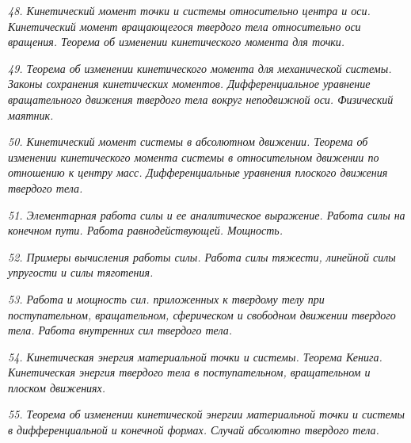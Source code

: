 \newpage %

\emph{48. Кинетический момент точки и системы относительно центра и оси.
Кинетический момент вращающегося твердого тела относительно оси вращения.
Теорема об изменении кинетического момента для точки.}

\newpage %

\emph{49. Теорема об изменении кинетического момента для механической системы.
Законы сохранения кинетических моментов. Дифференциальное уравнение
вращательного движения твердого тела вокруг неподвижной оси. Физический
маятник.}

\newpage %

\emph{50. Кинетический момент системы в абсолютном движении. Теорема об
изменении кинетического момента системы в относительном движении по
отношению к центру масс. Дифференциальные уравнения плоского движения
твердого тела.}

\newpage %

\emph{51. Элементарная работа силы и ее аналитическое выражение. Работа силы на
конечном пути. Работа равнодействующей. Мощность.}

\newpage %

\emph{52. Примеры вычисления работы силы. Работа силы тяжести, линейной силы
упругости и силы тяготения.}

\newpage %

\emph{53. Работа и мощность сил. приложенных к твердому телу при поступательном,
вращательном, сферическом и свободном движении твердого тела. Работа
внутренних сил твердого тела.}

\newpage %

\emph{54. Кинетическая энергия материальной точки и системы. Теорема Кенига.
Кинетическая энергия твердого тела в поступательном, вращательном и плоском
движениях.}

\newpage %

\emph{55. Теорема об изменении кинетической энергии материальной точки и системы
в дифференциальной и конечной формах. Случай абсолютно твердого тела.}


